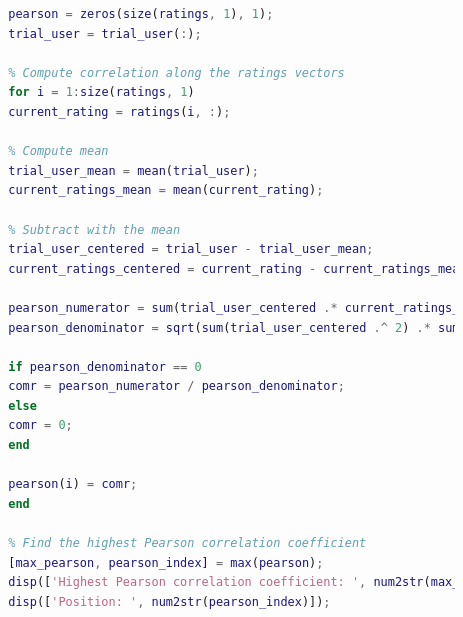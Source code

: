 	\begin{lstlisting}[style=StyleCode, language=MATLAB]
		% Compute the Pearson correlation coefficient
		pearson = zeros(size(ratings, 1), 1);
		trial_user = trial_user(:);
		
		% Compute correlation along the ratings vectors
		for i = 1:size(ratings, 1)
		current_rating = ratings(i, :);
		
		% Compute mean
		trial_user_mean = mean(trial_user);
		current_ratings_mean = mean(current_rating);
		
		% Subtract with the mean
		trial_user_centered = trial_user - trial_user_mean;
		current_ratings_centered = current_rating - current_ratings_mean;
		
		pearson_numerator = sum(trial_user_centered .* current_ratings_centered);
		pearson_denominator = sqrt(sum(trial_user_centered .^ 2) .* sum(current_ratings_centered .^ 2));
		
		if pearson_denominator == 0
		comr = pearson_numerator / pearson_denominator;
		else
		comr = 0;
		end
		
		pearson(i) = comr;
		end
		
		% Find the highest Pearson correlation coefficient
		[max_pearson, pearson_index] = max(pearson);
		disp(['Highest Pearson correlation coefficient: ', num2str(max_pearson)]);
		disp(['Position: ', num2str(pearson_index)]);
	\end{lstlisting}